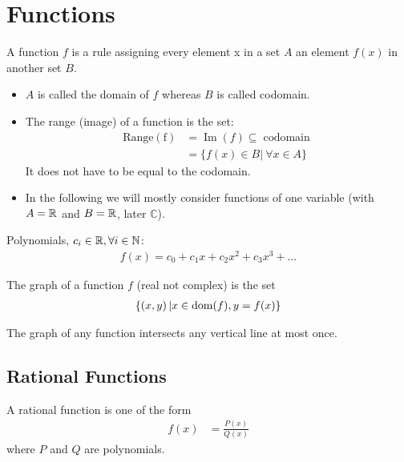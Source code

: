 



\section{Functions}
\begin{df}
 A function $f$ is a rule assigning every element x in a set $A$ an element $f\left(  x \right)$ in another set $B$.
 \end{df}
 \begin{rk} \mbox \\
 \begin{itemize}
 \item
 $A$ is called the domain of $f$ whereas $B$ is called codomain.
 \item
 The range (image) of a function is the set:
 \begin{align*}
  \operatorname{Range(f)} & = \operatorname{Im} (f) \subseteq \operatorname{codomain} \\
  & = \{ f(x) \in B| ~\forall x \in A \}
 \end{align*}
 It does not have to be equal to the codomain.
 \item
 In the following we will mostly consider functions of one variable (with $A = \mathbb R$ and $B = \mathbb R$, later $\mathbb C$).
 \end{itemize}
 \end{rk}
 
 
 \begin{ex} Polynomials, $c_i \in \mathbb R, \forall i\in \mathbb N$:
 \begin{align*}
  f(x) = c_0 + c_1 x + c_2 x^2 + c_3 x^3 + \dots
  \end{align*}  
  \end{ex}
\begin{df} The graph of a function $f$ (real not complex) is the set 
\begin{align*}
\{\left( x,y\right)|x \in \operatorname{dom}( f), y = f(x)\}
\end{align*}
\end{df}
\begin{pr}
The graph of any function intersects any vertical line at most once.
\end{pr}


\subsection{Rational Functions}
\begin{df}
A rational function is one of the form
\begin{align*} f(x) & = \frac{P\left( x\right)}{Q\left( x\right)}  \end{align*}
where $P$ and $Q$ are polynomials.
\end{df}


